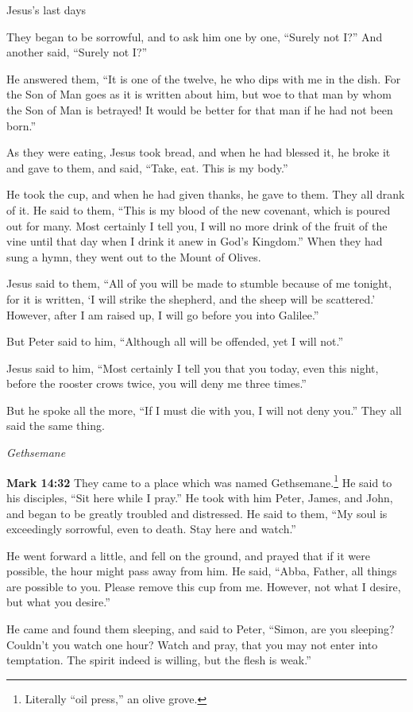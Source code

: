 \documentclass[10pt,twoside]{article} %
\newcommand{\quotesize}{\normalsize{}}
\newenvironment{quotetext}{\begingroup\quotesize}{\endgroup}
\newcommand{\bible}[2]{\begin{quotetext}\textbf{#1} #2\end{quotetext}}
\newcommand{\gospelmark}[2]{\bible{Mark #1}{#2}}
\newcommand{\subhead}[1]{\emph{#1}\par}
\begin{document}
\begin{section}{Jesus's last days}
{  They began to be sorrowful, and to ask him one by one, ``Surely not I?'' And another said, ``Surely not I?''

  He answered them, ``It is one of the twelve, he who dips with me in the dish.    For the Son of Man goes as it is written about him, but woe to that man by whom the Son of Man is betrayed! It would be better for that man if he had not been born.''

  As they were eating, Jesus took bread, and when he had blessed it, he broke it and gave to them, and said, ``Take, eat. This is my body.''

  He took the cup, and when he had given thanks, he gave to them. They all drank of it.   He said to them, ``This is my blood of the new covenant, which is poured out for many.    Most certainly I tell you, I will no more drink of the fruit of the vine until that day when I drink it anew in God's Kingdom.''   When they had sung a hymn, they went out to the Mount of Olives.

  Jesus said to them, ``All of you will be made to stumble because of me tonight, for it is written, `I will strike the shepherd, and the sheep will be scattered.'    However, after I am raised up, I will go before you into Galilee.''

  But Peter said to him, ``Although all will be offended, yet I will not.''

  Jesus said to him, ``Most certainly I tell you that you today, even this night, before the rooster crows twice, you will deny me three times.''

  But he spoke all the more, ``If I must die with you, I will not deny you.'' They all said the same thing.
}

\subhead{Gethsemane}

\gospelmark{14:32}{
  They came to a place which was named Gethsemane.\footnote{Literally ``oil press,'' an olive grove.}
He said to his disciples, ``Sit here while I pray.''   He took with him Peter, James, and John, and began to be greatly troubled and distressed.   He said to them, ``My soul is exceedingly sorrowful, even to death. Stay here and watch.''

  He went forward a little, and fell on the ground, and prayed that if it were possible, the hour might pass away from him.   He said, ``Abba, Father, all things are possible to you. Please remove this cup from me. However, not what I desire, but what you desire.''

  He came and found them sleeping, and said to Peter, ``Simon, are you sleeping? Couldn't you watch one hour?    Watch and pray, that you may not enter into temptation. The spirit indeed is willing, but the flesh is weak.''

}
\end{section}
\end{document}
